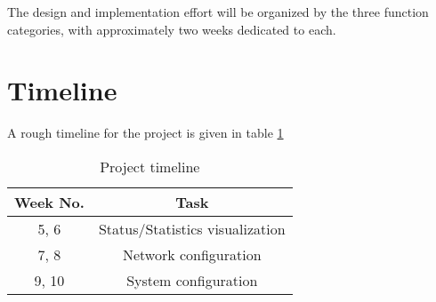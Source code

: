 \documentclass{sig-alternate-05-2015}
\begin{document}
The design and implementation effort will be organized by the three function categories, with approximately two weeks dedicated to each.

\section{Timeline}

A rough timeline for the project is given in table \ref{table:timeline}

\begin{table}[h]
\centering
\caption{Project timeline}
\label{table:timeline}
\begin{tabular}{c|c} \hline
Week No. & Task \\ \hline
5, 6 & Status/Statistics visualization \\ \hline
7, 8 & Network configuration \\ \hline
9, 10 & System configuration \\
\hline\end{tabular}
\end{table}
\end{document}

